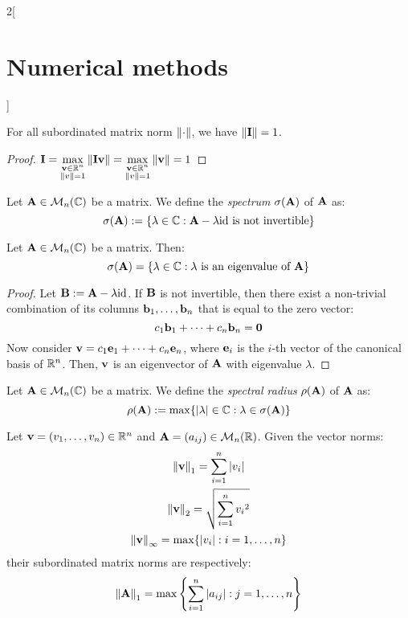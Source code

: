 \documentclass[../../../main_math.tex]{subfiles}
\begin{document}
\begin{multicols}{2}[\section{Numerical methods}]
\begin{lemma}
    For all subordinated matrix norm $\left\|\cdot\right\|$, we have $\left\|\boldsymbol{\mathrm{I}}\right\|=1$.
  \end{lemma}
  \begin{proof}
    $\displaystyle\boldsymbol{\mathrm{I}}=\max_{\substack{\boldsymbol{\mathrm{v}}\in\mathbb{R}^n\\\left\|v\right\|=1}}\left\|\boldsymbol{\mathrm{Iv}}\right\|=\max_{\substack{\boldsymbol{\mathrm{v}}\in\mathbb{R}^n\\\left\|v\right\|=1}}\left\|\boldsymbol{\mathrm{v}}\right\|=1$
  \end{proof}
  \begin{definition}
    Let $\boldsymbol{\mathrm{A}}\in\mathcal{M}_n(\mathbb{C})$ be a matrix. We define the \emph{spectrum} $\sigma(\boldsymbol{\mathrm{A}})$ of $\boldsymbol{\mathrm{A}}$ as: $$\sigma(\boldsymbol{\mathrm{A}}):=\{\lambda\in\mathbb{C}:\boldsymbol{\mathrm{A}}-\lambda\mathrm{id}\text{ is not invertible}\}$$
  \end{definition}
  \begin{proposition}
    Let $\boldsymbol{\mathrm{A}}\in\mathcal{M}_n(\mathbb{C})$ be a matrix. Then: $$\sigma(\boldsymbol{\mathrm{A}})=\{\lambda\in\mathbb{C}:\lambda\text{ is an eigenvalue of }\boldsymbol{\mathrm{A}}\}$$
  \end{proposition}
  \begin{proof}
    Let $\boldsymbol{\mathrm{B}}:=\boldsymbol{\mathrm{A}}-\lambda\mathrm{id}$. If $\boldsymbol{\mathrm{B}}$ is not invertible, then there exist a non-trivial combination of its columns $\boldsymbol{\mathrm{b}}_1,\ldots,\boldsymbol{\mathrm{b}}_n$ that is equal to the zero vector:
    $$
      c_1\boldsymbol{\mathrm{b}}_1+\cdots+c_n\boldsymbol{\mathrm{b}}_n=\boldsymbol{\mathrm{0}}
    $$
    Now consider $\boldsymbol{\mathrm{v}}=c_1\boldsymbol{\mathrm{e}}_1+\cdots+c_n\boldsymbol{\mathrm{e}}_n$, where $\boldsymbol{\mathrm{e}}_i$ is the $i$-th vector of the canonical basis of $\mathbb{R}^n$. Then, $\boldsymbol{\mathrm{v}}$ is an eigenvector of $\boldsymbol{\mathrm{A}}$ with eigenvalue $\lambda$.
  \end{proof}
  \begin{definition}
    Let $\boldsymbol{\mathrm{A}}\in\mathcal{M}_n(\mathbb{C})$ be a matrix. We define the \emph{spectral radius} $\rho(\boldsymbol{\mathrm{A}})$ of $\boldsymbol{\mathrm{A}}$ as: $$\rho(\boldsymbol{\mathrm{A}}):=\max\{\abs{\lambda}\in\mathbb{C}:\lambda\in\sigma(\boldsymbol{\mathrm{A}})\}$$
  \end{definition}
  \begin{proposition}
    Let $\boldsymbol{\mathrm{v}}=(v_1,\ldots,v_n)\in\mathbb{R}^n$ and $\boldsymbol{\mathrm{A}}=(a_{ij})\in\mathcal{M}_n(\mathbb{R})$. Given the vector norms:
    \begin{gather*}
      \left\|\boldsymbol{\mathrm{v}}\right\|_1=\sum_{i=1}^n\abs{v_i}\\
      \left\|\boldsymbol{\mathrm{v}}\right\|_2=\sqrt{\sum_{i=1}^n{v_i}^2}\\
      \left\|\boldsymbol{\mathrm{v}}\right\|_\infty=\max\{\abs{v_i}:i=1,\ldots,n\}
    \end{gather*}
    their subordinated matrix norms are respectively:
    \begin{gather*}
      \norm{\vf{A}}_1=\max\left\{\sum_{i=1}^n\abs{a_{ij}}:j=1,\ldots,n\right\}\\

\end{gather*}
\end{proposition}
\end{multicols}
\end{document}
